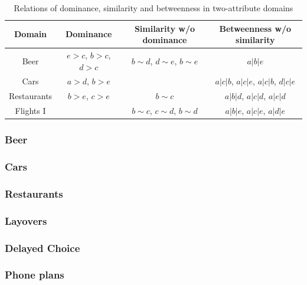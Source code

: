 \documentclass[11pt,letter]{article}
\begin{document}
\begin{table}
	\centering
	\begin{tabular}{cccc}
		Domain & Dominance & Similarity w/o dominance & Betweenness w/o similarity \\
		\hline
		Beer
		& $e>c$, $b>c$, $d>c$ & $b \sim d$, $d \sim e$, $b \sim e$
		& $a|b|e$ \\
		Cars
		& $a>d$, $b>e$ & & $a|c|b$, $a|c|e$, $a|c|b$, $d|c|e$ \\
		Restaurants
		& $b>e$, $c>e$ & $b \sim c$ & $a|b|d$, $a|c|d$, $a|e|d$ \\
		Flights I 
		& & $b \sim c$, $c \sim d$, $b \sim d$ & $a|b|e$, $a|c|e$, $a|d|e$ \\
		\hline
	\end{tabular}\caption{Relations of dominance, similarity and betweenness in two-attribute domains}\label{t:CE}
\end{table}

\subsubsection{Beer}



\subsubsection{Cars}



\subsubsection{Restaurants}



\subsubsection{Layovers}



\subsubsection{Delayed Choice}



\subsubsection{Phone plans}
\end{document}

